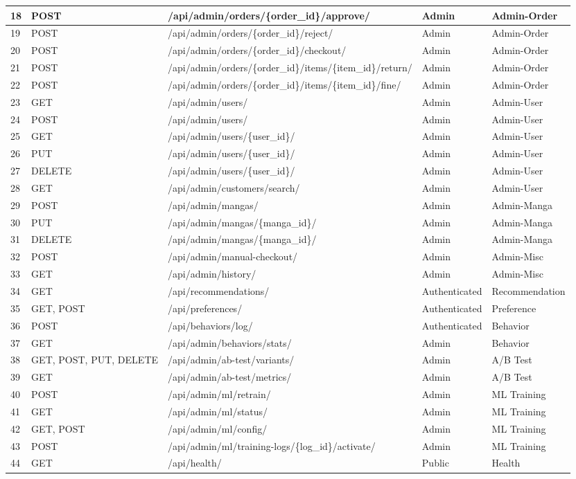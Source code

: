 \begin{longtable}{|p{0.6cm}|p{1.6cm}|p{4.3cm}|p{1.9cm}|p{1.7cm}|}
18 & POST & /api/admin/orders/\{order\_id\}/approve/ & Admin & Admin-Order \\ \hline
19 & POST & /api/admin/orders/\{order\_id\}/reject/ & Admin & Admin-Order \\ \hline
20 & POST & /api/admin/orders/\{order\_id\}/checkout/ & Admin & Admin-Order \\ \hline
21 & POST & /api/admin/orders/\{order\_id\}/items/\{item\_id\}/return/ & Admin & Admin-Order \\ \hline
22 & POST & /api/admin/orders/\{order\_id\}/items/\{item\_id\}/fine/ & Admin & Admin-Order \\ \hline
23 & GET & /api/admin/users/ & Admin & Admin-User \\ \hline
24 & POST & /api/admin/users/ & Admin & Admin-User \\ \hline
25 & GET & /api/admin/users/\{user\_id\}/ & Admin & Admin-User \\ \hline
26 & PUT & /api/admin/users/\{user\_id\}/ & Admin & Admin-User \\ \hline
27 & DELETE & /api/admin/users/\{user\_id\}/ & Admin & Admin-User \\ \hline
28 & GET & /api/admin/customers/search/ & Admin & Admin-User \\ \hline
29 & POST & /api/admin/mangas/ & Admin & Admin-Manga \\ \hline
30 & PUT & /api/admin/mangas/\{manga\_id\}/ & Admin & Admin-Manga \\ \hline
31 & DELETE & /api/admin/mangas/\{manga\_id\}/ & Admin & Admin-Manga \\ \hline
32 & POST & /api/admin/manual-checkout/ & Admin & Admin-Misc \\ \hline
33 & GET & /api/admin/history/ & Admin & Admin-Misc \\ \hline
34 & GET & /api/recommendations/ & Authenticated & Recommendation \\ \hline
35 & GET, POST & /api/preferences/ & Authenticated & Preference \\ \hline
36 & POST & /api/behaviors/log/ & Authenticated & Behavior \\ \hline
37 & GET & /api/admin/behaviors/stats/ & Admin & Behavior \\ \hline
38 & GET, POST, PUT, DELETE & /api/admin/ab-test/variants/ & Admin & A/B Test \\ \hline
39 & GET & /api/admin/ab-test/metrics/ & Admin & A/B Test \\ \hline
40 & POST & /api/admin/ml/retrain/ & Admin & ML Training \\ \hline
41 & GET & /api/admin/ml/status/ & Admin & ML Training \\ \hline
42 & GET, POST & /api/admin/ml/config/ & Admin & ML Training \\ \hline
43 & POST & /api/admin/ml/training-logs/\{log\_id\}/activate/ & Admin & ML Training \\ \hline
44 & GET & /api/health/ & Public & Health \\ \hline
\end{longtable}
\endgroup


